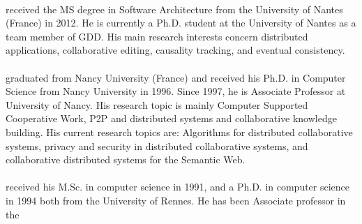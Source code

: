 \ \\
  received the MS degree in Software Architecture from the University
  of Nantes (France) in 2012. He is currently a Ph.D. student at the
  University of Nantes as a team member of GDD. His main research
  interests concern distributed applications, collaborative editing,
  causality tracking, and eventual consistency.
\ \\ \ \\
  graduated from Nancy University (France) and received his Ph.D. in
  Computer Science from Nancy University in 1996. Since 1997, he is
  Associate Professor at University of Nancy. His research topic is
  mainly Computer Supported Cooperative Work, P2P and distributed
  systems and collaborative knowledge building. His current research
  topics are: Algorithms for distributed collaborative systems,
  privacy and security in distributed collaborative systems, and
  collaborative distributed systems for the Semantic Web.
\ \\ \ \\
 received his M.Sc.  in computer science in
  1991, and a Ph.D. in computer science in 1994 both from the
  University of Rennes. He has been Associate professor in the
